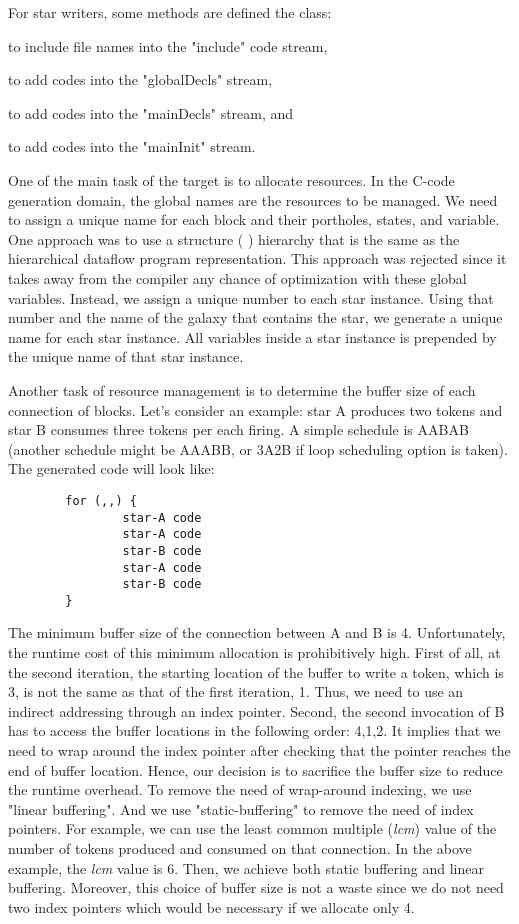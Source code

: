 For star writers, some methods are defined the 
class:

to include file names into the "include" code stream,

to add codes into the "globalDecls" stream,

to add codes into the "mainDecls" stream, and

to add codes into the "mainInit" stream.

 One of the main task of the target is to allocate resources.
 In the C-code generation domain, the global names are the resources to
be managed.
 We need to assign a unique name for each block and their portholes, states,
and variable. One approach was to use a structure (
) hierarchy that is the same as the hierarchical dataflow program
representation.
 This approach was rejected since it takes away from the compiler any
chance of optimization with these global variables. 
 Instead, we assign a unique number to each star instance.
 Using that number and the name of the galaxy that contains the star,
we generate a unique name for each star instance.
 All variables inside a star instance is prepended by the unique name of
that star instance.

 Another task of resource management is to determine the buffer size of
each connection of blocks.
 Let's consider an example: star A produces two tokens and star B consumes
three tokens per each firing.
 A simple schedule is AABAB (another schedule might be AAABB, or 3A2B if loop
scheduling option is taken).
 The generated code will look like:

\begin{verbatim}
        for (,,) {
                star-A code
                star-A code
                star-B code
                star-A code
                star-B code
        }
\end{verbatim}

 The minimum buffer size of the connection between A and B is 4.
 Unfortunately, the runtime cost of this minimum allocation is prohibitively
high.
 First of all, at the second iteration, the starting location of the buffer to
write a token, which is 3, is not the same as that of the first iteration, 1.
 Thus, we need to use an indirect addressing through an index pointer.
  Second, the second invocation of B has to access the buffer locations in
the following order: 4,1,2.
 It implies that we need to wrap around the index pointer after checking
that the pointer reaches the end of buffer location.
 Hence, our decision is to sacrifice the buffer size to reduce the runtime
overhead.
 To remove the need of wrap-around indexing, we use "linear
buffering".
 And we use "static-buffering" to remove the need of index pointers.
 For example, we can use the least common multiple (\emph{lcm})
value of the number of tokens produced and consumed on that connection.
 In the above example, the \emph{lcm} value is 6. Then, we achieve both
static buffering and linear buffering.
 Moreover, this choice of buffer size is not a waste since we do not need
two index pointers which would be necessary if we allocate only 4.

